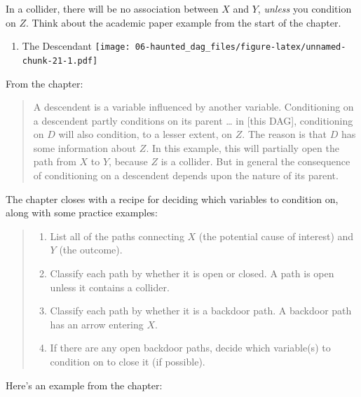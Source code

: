 \documentclass[
]{book}
\providecommand{\tightlist}{%
  \setlength{\itemsep}{0pt}\setlength{\parskip}{0pt}}
\begin{document}
In a collider, there will be no association between \(X\) and \(Y\), \emph{unless} you condition on \(Z\). Think about the academic paper example from the start of the chapter.

\begin{enumerate}
\def\labelenumi{\arabic{enumi}.}
\setcounter{enumi}{3}
\tightlist
\item
  The Descendant
  \texttt{[image: 06-haunted\_dag\_files/figure-latex/unnamed-chunk-21-1.pdf]}
\end{enumerate}

From the chapter:

\begin{quote}
A descendent is a variable influenced by another variable. Conditioning on a descendent partly conditions on its parent \ldots{} in {[}this DAG{]}, conditioning on \(D\) will also condition, to a lesser extent, on \(Z\). The reason is that \(D\) has some information about \(Z\). In this example, this will partially open the path from \(X\) to \(Y\), because \(Z\) is a collider. But in general the consequence of conditioning on a descendent depends upon the nature of its parent.
\end{quote}

The chapter closes with a recipe for deciding which variables to condition on, along with some practice examples:

\begin{quote}
\begin{enumerate}
\def\labelenumi{(\arabic{enumi})}
\item
  List all of the paths connecting \(X\) (the potential cause of interest) and \(Y\) (the outcome).
\item
  Classify each path by whether it is open or closed. A path is open unless it contains a collider.
\item
  Classify each path by whether it is a backdoor path. A backdoor path has an arrow entering \(X\).
\item
  If there are any open backdoor paths, decide which variable(s) to condition on to close it (if possible).
\end{enumerate}
\end{quote}

Here's an example from the chapter:
\end{document}
